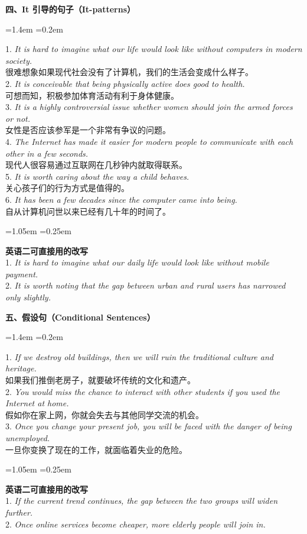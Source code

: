 \documentclass[11pt,a4paper]{ctexart}
\newcommand{\en}[1]{\textit{#1}}
\newenvironment{note}{%
  \par\addvspace{5pt}%
  \begin{list}{}{\leftmargin=1.05em \rightmargin=0.25em \listparindent=0pt
    \itemindent=0pt \topsep=0pt \parsep=2pt \itemsep=2pt \partopsep=0pt}%
  \item\relax\small\color{ink}%
}{%
  \end{list}\addvspace{5pt}%
}
\newenvironment{eg}{%
  \par\addvspace{4pt}%
  \begin{list}{}{\leftmargin=1.4em \rightmargin=0.2em \listparindent=0pt
    \itemindent=0pt \topsep=0pt \parsep=2pt \itemsep=2pt \partopsep=0pt}%
  \item\relax
}{%
  \end{list}\addvspace{5pt}%
}
\begin{document}
\par\addvspace{6pt}\noindent\textbf{四、It 引导的句子（It-patterns）}\par\addvspace{2pt}
\begin{eg}
1. \en{It is hard to imagine what our life would look like without computers in modern society.}\\
很难想象如果现代社会没有了计算机，我们的生活会变成什么样子。\\
2. \en{It is conceivable that being physically active does good to health.}\\
可想而知，积极参加体育活动有利于身体健康。\\
3. \en{It is a highly controversial issue whether women should join the armed forces or not.}\\
女性是否应该参军是一个非常有争议的问题。\\
4. \en{The Internet has made it easier for modern people to communicate with each other in a few seconds.}\\
现代人很容易通过互联网在几秒钟内就取得联系。\\
5. \en{It is worth caring about the way a child behaves.}\\
关心孩子们的行为方式是值得的。\\
6. \en{It has been a few decades since the computer came into being.}\\
自从计算机问世以来已经有几十年的时间了。\\
\end{eg}
\begin{note}
\textbf{英语二可直接用的改写}\\
1. \en{It is hard to imagine what our daily life would look like without mobile payment.}\\
2. \en{It is worth noting that the gap between urban and rural users has narrowed only slightly.}
\end{note}

\par\addvspace{6pt}\noindent\textbf{五、假设句（Conditional Sentences）}\par\addvspace{2pt}
\begin{eg}
1. \en{If we destroy old buildings, then we will ruin the traditional culture and heritage.}\\
如果我们推倒老房子，就要破坏传统的文化和遗产。\\
2. \en{You would miss the chance to interact with other students if you used the Internet at home.}\\
假如你在家上网，你就会失去与其他同学交流的机会。\\
3. \en{Once you change your present job, you will be faced with the danger of being unemployed.}\\
一旦你变换了现在的工作，就面临着失业的危险。\\
\end{eg}
\begin{note}
\textbf{英语二可直接用的改写}\\
1. \en{If the current trend continues, the gap between the two groups will widen further.}\\
2. \en{Once online services become cheaper, more elderly people will join in.}
\end{note}
\end{document}
